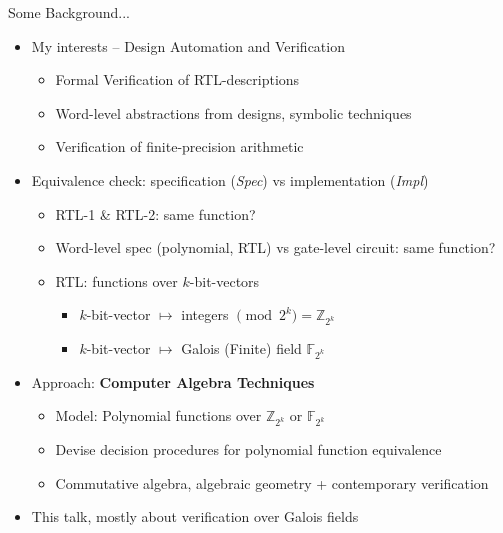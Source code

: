 \documentclass[xcolor=dvipsnames]{beamer}
\newcommand{\Fkk}{{\mathbb{F}}_{2^k}}
\newcommand{\Zkk}{{\mathbb{Z}}_{2^k}}
\begin{document}
\begin{frame}{\large{Some Background...}}

\begin{itemize}
\item My interests -- Design Automation and Verification
	\begin{itemize}
	\item Formal Verification of RTL-descriptions
        \item Word-level abstractions from designs, symbolic
          techniques
        \item Verification of finite-precision arithmetic
	\end{itemize}
\item Equivalence check: specification ({\it Spec}) vs implementation
  ({\it Impl})
	\begin{itemize}
	\item RTL-1 \& RTL-2: same function?
        \item  Word-level spec (polynomial, RTL) vs
          gate-level circuit: same function?
        \item RTL: functions over \alert{$k$-bit-vectors}
          \begin{itemize}
            \item $k$-bit-vector $\mapsto$ integers $\pmod{ 2^k} = \Zkk$
            \item $k$-bit-vector $\mapsto$ Galois (Finite) field $\Fkk$
          \end{itemize}
	\end{itemize}
\item Approach: {\bf Computer Algebra Techniques}
	\begin{itemize}
	\item  Model: Polynomial functions over $\Zkk$ or $\Fkk$
        \item  Devise decision procedures for polynomial function equivalence
        \item  Commutative algebra, algebraic geometry + contemporary
          verification
	\end{itemize}
\item This talk, mostly about verification over Galois fields
\end{itemize}
\end{frame}
\end{document}
